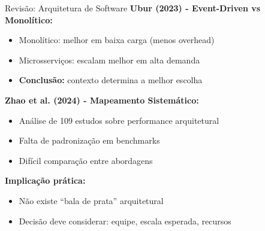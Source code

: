 \documentclass{beamer}
\begin{document}
    \begin{frame}{Revisão: Arquitetura de Software}
        \textbf{Ubur (2023) - Event-Driven vs Monolítico:}
        \begin{itemize}
            \item Monolítico: melhor em baixa carga (menos overhead)
            \item Microsserviços: escalam melhor em alta demanda
            \item \textbf{Conclusão:} contexto determina a melhor escolha
        \end{itemize}

        \vspace{0.4cm}

        \textbf{Zhao et al. (2024) - Mapeamento Sistemático:}
        \begin{itemize}
            \item Análise de 109 estudos sobre performance arquitetural
            \item Falta de padronização em benchmarks
            \item Difícil comparação entre abordagens
        \end{itemize}

        \vspace{0.4cm}

        \textbf{Implicação prática:}
        \begin{itemize}
            \item Não existe ``bala de prata'' arquitetural
            \item Decisão deve considerar: equipe, escala esperada, recursos
        \end{itemize}
    \end{frame}
\end{document}
